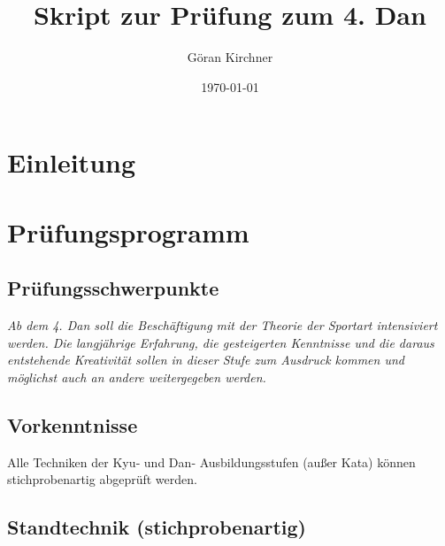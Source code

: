 \documentclass[justified, a4paper, notitlepage, captions=tableheading, nobib]{tufte-handout}
\author{Göran Kirchner}
\date{\today}
\title{Skript zur Prüfung zum 4. Dan}
\begin{document}
\maketitle
\tableofcontents

\ifxetex
  \newcommand{\textls}[2][5]{%
    \begingroup\addfontfeatures{LetterSpace=#1}#2\endgroup
  }
  \renewcommand{\allcapsspacing}[1]{\textls[15]{#1}}
  \renewcommand{\smallcapsspacing}[1]{\textls[10]{#1}}
  \renewcommand{\allcaps}[1]{\textls[15]{\MakeTextUppercase{#1}}}
  \renewcommand{\smallcaps}[1]{\smallcapsspacing{\scshape\MakeTextLowercase{#1}}}
  \renewcommand{\textsc}[1]{\smallcapsspacing{\textsmallcaps{#1}}}
\fi

\newpage
\section{Einleitung}
\label{sec:org7e0a785}

\newpage
\section{Prüfungsprogramm}
\label{sec:orgc460068}
\subsection{Prüfungsschwerpunkte}
\label{sec:org53cf2dd}
\emph{Ab dem 4. Dan soll die Beschäftigung mit der Theorie der Sportart intensiviert werden.
Die langjährige Erfahrung, die gesteigerten Kenntnisse und die daraus entstehende Kreativität sollen in dieser Stufe zum Ausdruck kommen und möglichst auch an andere weitergegeben werden.}

\subsection{Vorkenntnisse}
\label{sec:org097b516}
Alle Techniken der Kyu‐ und Dan‐ Ausbildungsstufen (außer Kata) können stichprobenartig abgeprüft werden.

\subsection{Standtechnik (stichprobenartig)}
\label{sec:org60a6063}
\end{document}
